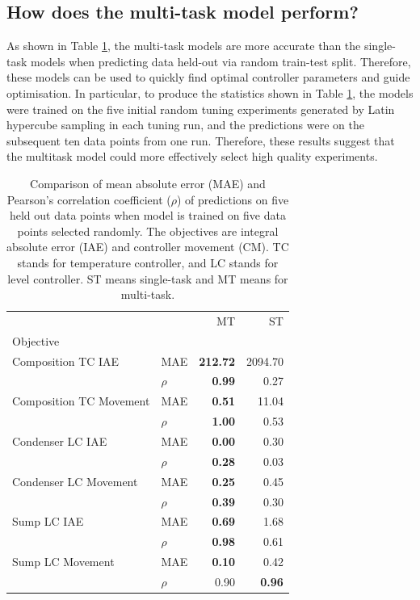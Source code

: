 
\subsection{How does the multi-task model perform?}

As shown in Table \ref{tab:mt_vs_st_controlbo}, the multi-task models are more accurate than the single-task models when predicting data held-out via random train-test split. Therefore, these models can be used to quickly find optimal controller parameters and guide optimisation. In particular, to produce the statistics shown in Table \ref{tab:mt_vs_st_controlbo}, the models were trained on the five initial random tuning experiments generated by Latin hypercube sampling in each tuning run, and the predictions were on the subsequent ten data points from one run. Therefore, these results suggest that the multitask model could more effectively select high quality experiments.

\begin{table}[]
    \centering
    \caption{Comparison of mean absolute error (MAE) and Pearson's correlation coefficient ($\rho$) of predictions on five held out data points when model is trained on five data points selected randomly. The objectives are integral absolute error (IAE) and controller movement (CM). TC stands for temperature controller, and LC stands for level controller.  ST means single-task and MT means for multi-task.}
    \begin{tabular}{llrr}
    
    \toprule
                     &  &      MT &       ST \\
    Objective & {} &         &          \\
    \midrule
    Composition TC IAE & MAE&  \textbf{212.72} &  2094.70 \\
                     & $\rho$&    \textbf{0.99 }&     0.27 \\
    Composition TC Movement & MAE&    \textbf{0.51} &    11.04 \\
                     & $\rho$&    \textbf{1.00} &     0.53 \\
    Condenser LC IAE & MAE&    \textbf{0.00} &     0.30 \\
                     & $\rho$&    \textbf{0.28} &     0.03 \\
    Condenser LC Movement & MAE&    \textbf{0.25} &     0.45 \\
                     & $\rho$&    \textbf{0.39} &     0.30 \\
    Sump LC IAE & MAE&    \textbf{0.69} &     1.68 \\
                     & $\rho$&    \textbf{0.98} &     0.61 \\
    Sump LC Movement & MAE&    \textbf{0.10} &     0.42 \\
                     & $\rho$&    0.90 &    \textbf{ 0.96} \\
    \bottomrule
    \end{tabular}
    \label{tab:mt_vs_st_controlbo}
\end{table}


